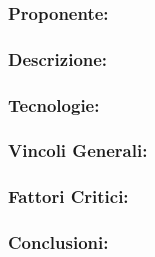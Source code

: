 \subsubsection{Proponente:}

\subsubsection{Descrizione:}

\subsubsection{Tecnologie:}

\subsubsection{Vincoli Generali:}

\subsubsection{Fattori Critici:}

\subsubsection{Conclusioni:}